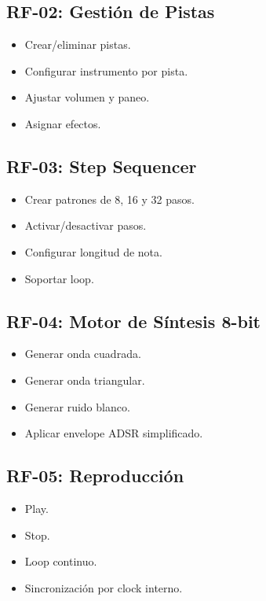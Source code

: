 \documentclass[12pt]{article}
\begin{document}
\subsection{RF-02: Gestión de Pistas}

\begin{itemize}
\item Crear/eliminar pistas.
\item Configurar instrumento por pista.
\item Ajustar volumen y paneo.
\item Asignar efectos.
\end{itemize}

\subsection{RF-03: Step Sequencer}

\begin{itemize}
\item Crear patrones de 8, 16 y 32 pasos.
\item Activar/desactivar pasos.
\item Configurar longitud de nota.
\item Soportar loop.
\end{itemize}

\subsection{RF-04: Motor de Síntesis 8-bit}

\begin{itemize}
\item Generar onda cuadrada.
\item Generar onda triangular.
\item Generar ruido blanco.
\item Aplicar envelope ADSR simplificado.
\end{itemize}

\subsection{RF-05: Reproducción}

\begin{itemize}
\item Play.
\item Stop.
\item Loop continuo.
\item Sincronización por clock interno.
\end{itemize}
\end{document}
